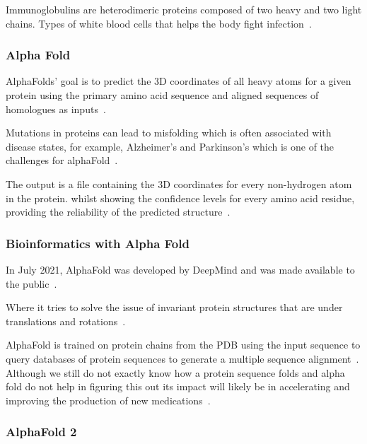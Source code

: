 \documentclass[]{final_report}
\begin{document}
\begin{definition}[Immunoglobulin]
    Immunoglobulins are heterodimeric proteins composed of two heavy and two light chains. Types of white blood cells that helps the body fight infection~\cite{schroeder_structure_2010}.
\end{definition}

\clearpage

\subsubsection{Alpha Fold}

AlphaFolds' goal is to predict the 3D coordinates of all heavy atoms for a given protein using the primary amino acid sequence and aligned sequences of homologues as inputs~\cite{jumper_highly_2021}.

Mutations in proteins can lead to misfolding which is often associated with disease states, for example, Alzheimer’s and Parkinson’s which is one of the challenges for alphaFold~\cite{felix_brief_nodate}.

The output is a file containing the 3D coordinates for every non-hydrogen atom in the protein. whilst showing the confidence levels for every amino acid residue, providing the reliability of the predicted structure~\cite{felix_brief_nodate}.

\subsubsection{Bioinformatics with Alpha Fold}

In July 2021, AlphaFold was developed by DeepMind and was made available to
the public~\cite{tunyasuvunakool_highly_2021}. 

Where it tries to solve the issue of invariant protein structures that are under translations and rotations~\cite{baldi_principled_nodate}.

AlphaFold is trained on protein chains from the PDB using the input sequence to query databases of protein sequences to generate a multiple sequence alignment~\cite{jumper_highly_2021}. Although we still do not exactly know how a protein sequence folds and alpha fold do not help in figuring this out its impact will likely be in accelerating and improving the production of new medications~\cite{nussinov_alphafold_2022}.


\subsubsection{AlphaFold 2}
\end{document}
